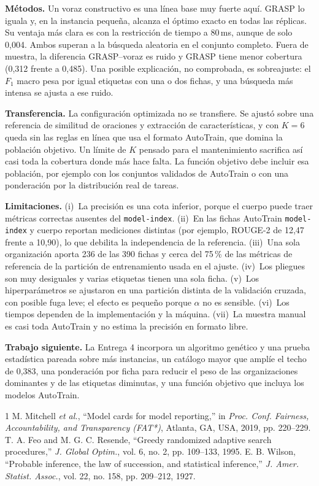 \documentclass[conference]{IEEEtran}
\begin{document}
	\textbf{M\'etodos.} Un voraz constructivo es una l\'inea base muy fuerte aqu\'i. GRASP lo iguala y, en la instancia peque\~na, alcanza el \'optimo exacto en todas las r\'eplicas. Su ventaja m\'as clara es con la restricci\'on de tiempo a 80\,ms, aunque de solo 0,004. Ambos superan a la b\'usqueda aleatoria en el conjunto completo. Fuera de muestra, la diferencia GRASP--voraz es ruido y GRASP tiene menor cobertura (0,312 frente a 0,485). Una posible explicaci\'on, no comprobada, es sobreajuste: el $F_1$ macro pesa por igual etiquetas con una o dos fichas, y una b\'usqueda m\'as intensa se ajusta a ese ruido.
	
	\textbf{Transferencia.} La configuraci\'on optimizada no se transfiere. Se ajust\'o sobre una referencia de similitud de oraciones y extracci\'on de caracter\'isticas, y con $K=6$ queda sin las reglas en l\'inea que usa el formato AutoTrain, que domina la poblaci\'on objetivo. Un l\'imite de $K$ pensado para el mantenimiento sacrifica as\'i casi toda la cobertura donde m\'as hace falta. La funci\'on objetivo debe incluir esa poblaci\'on, por ejemplo con los conjuntos validados de AutoTrain o con una ponderaci\'on por la distribuci\'on real de tareas.
	
	\textbf{Limitaciones.}
	(i)~La precisi\'on es una cota inferior, porque el cuerpo puede traer m\'etricas correctas ausentes del \texttt{model-index}.
	(ii)~En las fichas AutoTrain \texttt{model-index} y cuerpo reportan mediciones distintas (por ejemplo, ROUGE-2 de 12,47 frente a 10,90), lo que debilita la independencia de la referencia.
	(iii)~Una sola organizaci\'on aporta 236 de las 390 fichas y cerca del 75\,\% de las m\'etricas de referencia de la partici\'on de entrenamiento usada en el ajuste.
	(iv)~Los pliegues son muy desiguales y varias etiquetas tienen una sola ficha.
	(v)~Los hiperpar\'ametros se ajustaron en una partici\'on distinta de la validaci\'on cruzada, con posible fuga leve; el efecto es peque\~no porque $\alpha$ no es sensible.
	(vi)~Los tiempos dependen de la implementaci\'on y la m\'aquina.
	(vii)~La muestra manual es casi toda AutoTrain y no estima la precisi\'on en formato libre.
	
	\textbf{Trabajo siguiente.} La Entrega 4 incorpora un algoritmo gen\'etico y una prueba estad\'istica pareada sobre m\'as instancias, un cat\'alogo mayor que ampl\'ie el techo de 0,383, una ponderaci\'on por ficha para reducir el peso de las organizaciones dominantes y de las etiquetas diminutas, y una funci\'on objetivo que incluya los modelos AutoTrain.
	
	\begin{thebibliography}{1}
		 M. Mitchell \emph{et al.}, ``Model cards for model reporting,'' in \emph{Proc. Conf. Fairness, Accountability, and Transparency (FAT*)}, Atlanta, GA, USA, 2019, pp. 220--229.
		 T. A. Feo and M. G. C. Resende, ``Greedy randomized adaptive search procedures,'' \emph{J. Global Optim.}, vol. 6, no. 2, pp. 109--133, 1995.
		 E. B. Wilson, ``Probable inference, the law of succession, and statistical inference,'' \emph{J. Amer. Statist. Assoc.}, vol. 22, no. 158, pp. 209--212, 1927.
	\end{thebibliography}
	
\end{document}
